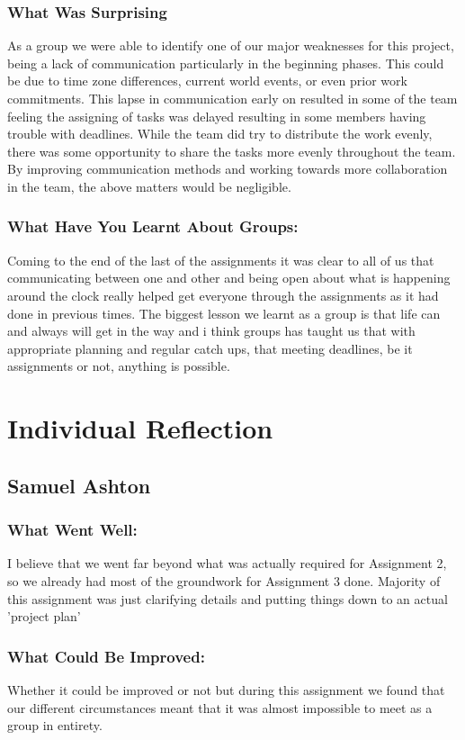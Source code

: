 \documentclass[11pt, oneside, a4paper, titlepage]{article}
\begin{document}
\subsubsection{What Was Surprising}
As a group we were able to identify one of our major weaknesses for this project, being a lack of communication particularly in the beginning phases. This could be due to time zone differences, current world events, or even prior work commitments. This lapse in communication early on resulted in some of the team feeling the assigning of tasks was delayed resulting in some members having trouble with deadlines. While the team did try to distribute the work evenly, there was some opportunity to share the tasks more evenly throughout the team. By improving communication methods and working towards more collaboration in the team, the above matters would be negligible. 

\subsubsection{What Have You Learnt About Groups:}
Coming to the end of the last of the assignments it was clear to all of us that communicating between one and other and being open about what is happening around the clock really helped get everyone through the assignments as it had done in previous times. The biggest lesson we learnt as a group is that life can and always will get in the way and i think groups has taught us that with appropriate planning  and regular catch ups, that meeting deadlines, be it assignments or not, anything is possible.

\section{Individual Reflection}

\subsection{Samuel Ashton}
\subsubsection{What Went Well:}
I  believe that we went far beyond what was actually required for Assignment 2, so we already had most of the groundwork for Assignment 3 done.  Majority of this assignment was just clarifying details and putting things down to an actual 'project plan' 

\subsubsection{What Could Be Improved:}
Whether it could be improved or not but during this assignment we found that our different circumstances meant that it was almost impossible to meet as a group in entirety.  
\end{document}
